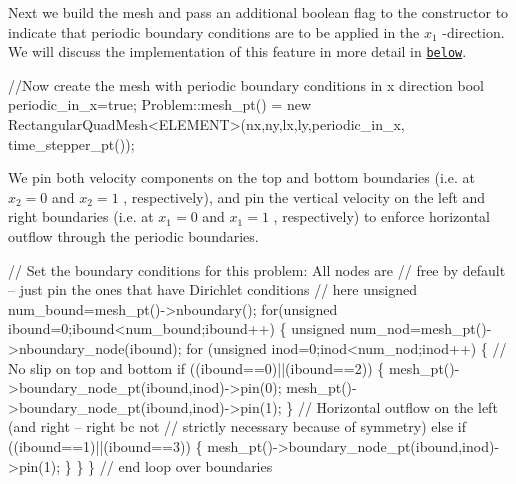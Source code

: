 Next we build the mesh and pass an additional boolean flag to the constructor to indicate that periodic boundary conditions are to be applied in the $ x_1$ -\/direction. We will discuss the implementation of this feature in more detail in \href{#periodic}{\tt below}.


\begin{DoxyCodeInclude}

 \textcolor{comment}{//Now create the mesh with periodic boundary conditions in x direction}
 \textcolor{keywordtype}{bool} periodic\_in\_x=\textcolor{keyword}{true};
 Problem::mesh\_pt() = 
  \textcolor{keyword}{new} RectangularQuadMesh<ELEMENT>(nx,ny,lx,ly,periodic\_in\_x,
                                   time\_stepper\_pt());

\end{DoxyCodeInclude}


We pin both velocity components on the top and bottom boundaries (i.\+e. at $ x_2=0$ and $ x_2=1$ , respectively), and pin the vertical velocity on the left and right boundaries (i.\+e. at $ x_1=0 $ and $ x_1=1 $ , respectively) to enforce horizontal outflow through the periodic boundaries.


\begin{DoxyCodeInclude}

 \textcolor{comment}{// Set the boundary conditions for this problem: All nodes are}
 \textcolor{comment}{// free by default -- just pin the ones that have Dirichlet conditions}
 \textcolor{comment}{// here}
 \textcolor{keywordtype}{unsigned} num\_bound=mesh\_pt()->nboundary();
 \textcolor{keywordflow}{for}(\textcolor{keywordtype}{unsigned} ibound=0;ibound<num\_bound;ibound++)
  \{
   \textcolor{keywordtype}{unsigned} num\_nod=mesh\_pt()->nboundary\_node(ibound);
   \textcolor{keywordflow}{for} (\textcolor{keywordtype}{unsigned} inod=0;inod<num\_nod;inod++)
    \{
     \textcolor{comment}{// No slip on top and bottom}
     \textcolor{keywordflow}{if} ((ibound==0)||(ibound==2))
      \{
       mesh\_pt()->boundary\_node\_pt(ibound,inod)->pin(0);
       mesh\_pt()->boundary\_node\_pt(ibound,inod)->pin(1);
      \}
     \textcolor{comment}{// Horizontal outflow on the left (and right -- right bc not}
     \textcolor{comment}{// strictly necessary because of symmetry)}
     \textcolor{keywordflow}{else} \textcolor{keywordflow}{if} ((ibound==1)||(ibound==3))
      \{
       mesh\_pt()->boundary\_node\_pt(ibound,inod)->pin(1);
      \}
    \}
  \} \textcolor{comment}{// end loop over boundaries}

\end{DoxyCodeInclude}


